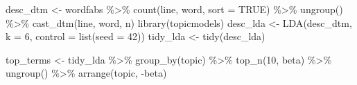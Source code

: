 \documentclass[]{tufte-book}
\newenvironment{Shaded}{}{}
\newcommand{\AttributeTok}[1]{\textcolor[rgb]{0.49,0.56,0.16}{#1}}
\newcommand{\ConstantTok}[1]{\textcolor[rgb]{0.53,0.00,0.00}{#1}}
\newcommand{\DecValTok}[1]{\textcolor[rgb]{0.25,0.63,0.44}{#1}}
\newcommand{\FunctionTok}[1]{\textcolor[rgb]{0.02,0.16,0.49}{#1}}
\newcommand{\NormalTok}[1]{#1}
\newcommand{\OtherTok}[1]{\textcolor[rgb]{0.00,0.44,0.13}{#1}}
\newcommand{\SpecialCharTok}[1]{\textcolor[rgb]{0.25,0.44,0.63}{#1}}
\begin{document}
\begin{Shaded}
\begin{Highlighting}[]
\NormalTok{desc\_dtm }\OtherTok{\textless{}{-}}\NormalTok{ wordfabs }\SpecialCharTok{\%\textgreater{}\%}
        \FunctionTok{count}\NormalTok{(line, word, }\AttributeTok{sort =} \ConstantTok{TRUE}\NormalTok{) }\SpecialCharTok{\%\textgreater{}\%}
        \FunctionTok{ungroup}\NormalTok{() }\SpecialCharTok{\%\textgreater{}\%}
        \FunctionTok{cast\_dtm}\NormalTok{(line, word, n)}
\FunctionTok{library}\NormalTok{(topicmodels)}
\NormalTok{desc\_lda }\OtherTok{\textless{}{-}} \FunctionTok{LDA}\NormalTok{(desc\_dtm, }\AttributeTok{k =} \DecValTok{6}\NormalTok{, }\AttributeTok{control =} \FunctionTok{list}\NormalTok{(}\AttributeTok{seed =} \DecValTok{42}\NormalTok{))}
\NormalTok{tidy\_lda }\OtherTok{\textless{}{-}} \FunctionTok{tidy}\NormalTok{(desc\_lda)}

\NormalTok{top\_terms }\OtherTok{\textless{}{-}}\NormalTok{ tidy\_lda }\SpecialCharTok{\%\textgreater{}\%}
  \FunctionTok{group\_by}\NormalTok{(topic) }\SpecialCharTok{\%\textgreater{}\%}
  \FunctionTok{top\_n}\NormalTok{(}\DecValTok{10}\NormalTok{, beta) }\SpecialCharTok{\%\textgreater{}\%}
  \FunctionTok{ungroup}\NormalTok{() }\SpecialCharTok{\%\textgreater{}\%}
  \FunctionTok{arrange}\NormalTok{(topic, }\SpecialCharTok{{-}}\NormalTok{beta)}


\end{Highlighting}
\end{Shaded}
\end{document}
